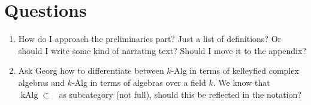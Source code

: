 \documentclass[12pt,a4paper]{article}
\DeclareMathOperator{\Set}{Set}
\DeclareMathOperator{\Frm}{Frm}
\DeclareMathOperator{\Top}{Top}
\DeclareMathOperator{\CAlgk}{CAlg_k}
\DeclareMathOperator{\kAlg}{kAlg}
\def\HomA{\ensuremath\mathcal{A}}
\begin{document}
\section{Questions}
\begin{enumerate}
	\item How do I approach the preliminaries part? Just a list of definitions? Or should I write some kind of narrating text? Should I move it to the appendix?
	\item Ask Georg how to differentiate between $k$-Alg in terms of kelleyfied complex algebras and $k$-Alg in terms of algebras over a field $k$. We know that $\kAlg \subset \CAlgk$ as subcategory (not full), should this be reflected in the notation?
\end{enumerate}
\end{document}
